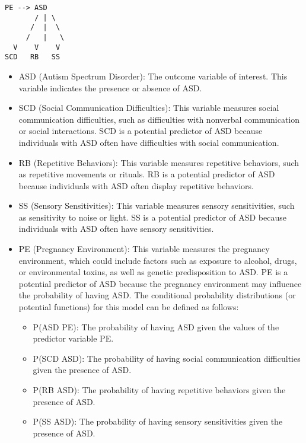 \begin{verbatim}
PE --> ASD
       / | \
      /  |  \
     /   |   \
  V    V    V
SCD   RB   SS
\end{verbatim}

\begin{itemize}
\item ASD (Autism Spectrum Disorder): The outcome variable of interest.
This variable indicates the presence or absence of ASD.

\item SCD (Social Communication Difficulties): This variable measures
social communication difficulties, such as difficulties with
nonverbal communication or social interactions. SCD is a potential
predictor of ASD because individuals with ASD often have
difficulties with social communication.

\item RB (Repetitive Behaviors): This variable measures repetitive
behaviors, such as repetitive movements or rituals. RB is a
potential predictor of ASD because individuals with ASD often
display repetitive behaviors.

\item SS (Sensory Sensitivities): This variable measures sensory
sensitivities, such as sensitivity to noise or light. SS is a
potential predictor of ASD because individuals with ASD often have
sensory sensitivities.

\item PE (Pregnancy Environment): This variable measures the pregnancy
environment, which could include factors such as exposure to
alcohol, drugs, or environmental toxins, as well as genetic
predisposition to ASD. PE is a potential predictor of ASD because
the pregnancy environment may influence the probability of having
ASD. The conditional probability distributions (or potential
functions) for this model can be defined as follows:

\begin{itemize}
\item P(ASD \textbar{} PE): The probability of having ASD given the values of
the predictor variable PE.

\item P(SCD \textbar{} ASD): The probability of having social communication
difficulties given the presence of ASD.

\item P(RB \textbar{} ASD): The probability of having repetitive behaviors
given the presence of ASD.

\item P(SS \textbar{} ASD): The probability of having sensory sensitivities
given the presence of ASD.

\end{itemize}

\end{itemize}

